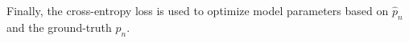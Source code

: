 \documentclass{article}
\begin{document}
Finally, the cross-entropy loss is used to optimize model parameters based on $\hat{p}_n$ and the ground-truth $p_n$.

\end{document}
